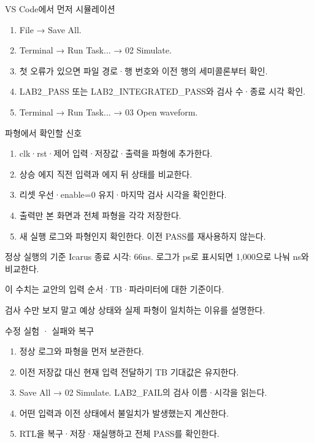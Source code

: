 \begin{frame}[label=simulation]{VS Code에서 먼저 시뮬레이션}
\small
\begin{enumerate}
\item File → Save All.
\item Terminal → Run Task... → 02 Simulate.
\item 첫 오류가 있으면 파일 경로·행 번호와 이전 행의 세미콜론부터 확인.
\item LAB2\_PASS 또는 LAB2\_INTEGRATED\_PASS와 검사 수·종료 시각 확인.
\item Terminal → Run Task... → 03 Open waveform.
\end{enumerate}
\end{frame}

\begin{frame}{파형에서 확인할 신호}
\small
\begin{enumerate}
\item clk·rst·제어 입력·저장값·출력을 파형에 추가한다.
\item 상승 에지 직전 입력과 에지 뒤 상태를 비교한다.
\item 리셋 우선·enable=0 유지·마지막 검사 시각을 확인한다.
\item 출력만 본 화면과 전체 파형을 각각 저장한다.
\item 새 실행 로그와 파형인지 확인한다. 이전 PASS를 재사용하지 않는다.
\end{enumerate}
\end{frame}

\begin{frame}{정상 실행의 기준}
\small
{}Icarus 종료 시각: 66ns. 로그가 ps로 표시되면 1,000으로 나눠 ns와 비교한다.\par\vspace{0.26cm}이 수치는 교안의 입력 순서·TB·파라미터에 대한 기준이다.\par\vspace{0.26cm}검사 수만 보지 말고 예상 상태와 실제 파형이 일치하는 이유를 설명한다.\par
\end{frame}

\begin{frame}{수정 실험 · 실패와 복구}
\small
\begin{enumerate}
\item 정상 로그와 파형을 먼저 보관한다.
\item 이전 저장값 대신 현재 입력 전달하기 TB 기대값은 유지한다.
\item Save All → 02 Simulate. LAB2\_FAIL의 검사 이름·시각을 읽는다.
\item 어떤 입력과 이전 상태에서 불일치가 발생했는지 계산한다.
\item RTL을 복구·저장·재실행하고 전체 PASS를 확인한다.
\end{enumerate}
\end{frame}

